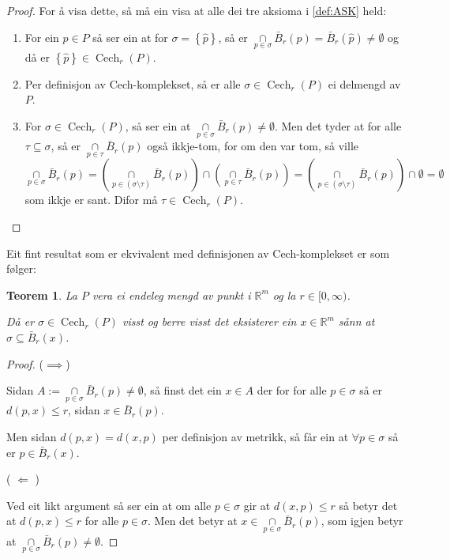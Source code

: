 \documentclass[a4paper, 12pt, norsk]{article}
\theoremstyle{plain}
\newtheorem{theorem}{Teorem}[section]
\theoremstyle{definition}
\newcommand{\Rb}{\mathbb{R}}
\newcommand{\intersect}{ \mathop{\cap}\limits }
\newcommand{\set}[1]{ \left\{ #1 \right\} } %
\DeclareMathOperator{\Cech}{Cech} %
\begin{document}
\begin{proof}
	For å visa dette, så må ein visa at alle dei tre aksioma i \autoref{def:ASK} held:
	\begin{enumerate}
		\item{ For ein \( \hat{p} \in P \) så ser ein at for \( \sigma = \set{\hat{p}} \), så er \( \intersect_{p\in\sigma}\bar{B}_r(p)=\bar{B}_r(\hat{p})\neq\emptyset \) og då er \( \set{\hat{p}} \in \Cech_r(P) \). }
		\item{ Per definisjon av Cech-komplekset, så er alle \( \sigma \in \Cech_r(P) \) ei delmengd av \( P \). }
		\item{ For \( \sigma \in \Cech_r(P) \), så ser ein at \( \intersect_{p\in\sigma} \bar{B}_r(p) \neq \emptyset \). Men det tyder at for alle \( \tau \subseteq \sigma \), så er \( \intersect_{p\in\tau} \bar{B}_r(p) \) også ikkje-tom, for om den var tom, så ville
			\[ 
				\intersect_{p\in\sigma} \bar{B}_r(p) = \left( \intersect_{p\in(\sigma\setminus\tau)} \bar{B}_r(p) \right) \intersect \left( \intersect_{p\in\tau} \bar{B}_r(p) \right) = \left( \intersect_{p\in(\sigma\setminus\tau)} \bar{B}_r(p) \right) \intersect \emptyset = \emptyset 
			\] 
			som ikkje er sant. Difor må \( \tau \in \Cech_r(P) \). }
	\end{enumerate}
\end{proof}

Eit fint resultat som er ekvivalent med definisjonen av Cech-komplekset er som følger:

\begin{theorem}
	La $P$ vera ei endeleg mengd av punkt i $\Rb^m$ og la $r\in[0, \infty)$.

	Då er \( \sigma \in \Cech_r(P) \) visst og berre visst det eksisterer ein \( x \in \Rb^m \) sånn at \( \sigma \subseteq \bar{B}_r(x) \).
\end{theorem}

\begin{proof}
	($\implies$)
	
	Sidan $A:=\intersect_{p\in\sigma}\bar{B}_r(p)\neq\emptyset$, så finst det ein $x\in A$ der for for alle \( p\in\sigma \) så er \( d(p,x)\leq r \), sidan $x\in\bar{B}_r(p)$.
	
	Men sidan $d(p,x)=d(x,p)$ per definisjon av metrikk, så får ein at \( \forall p\in\sigma \) så er \( p \in \bar{B}_r(x) \).
	
	( \( \Longleftarrow \) )
	
	Ved eit likt argument så ser ein at om alle \( p \in \sigma \) gir at \( d(x, p) \leq r \) så betyr det at \( d(p, x) \leq r \) for alle \( p \in \sigma \). Men det betyr at \( x \in \intersect_{p \in \sigma} \bar{B}_r(p) \), som igjen betyr at \( \intersect_{p \in \sigma} \bar{B}_r(p) \neq \emptyset \).
\end{proof}
\end{document}
